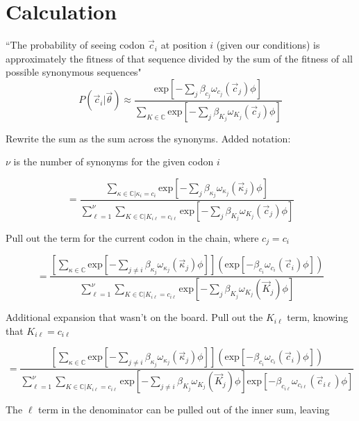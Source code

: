 \documentclass[11pt]{article} %
\begin{document}
\section{Calculation}

``The probability of seeing codon $\vec{c}_i$ at position $i$ (given our conditions) is approximately the fitness of that sequence divided by the sum of the fitness of all possible synonymous sequences"
\[
P(\vec{c}_i | \vec{\theta})
\approx
\frac{
\mbox{exp}\left[-\sum_{j} \beta_{c_j} \omega_{c_j} (\vec{c}_j) \phi \right]
}{
\sum _{K \in \mathbb{C}}
\mbox{exp}\left[-\sum_{j} \beta_{K_j} \omega_{K_j} (\vec{c}_j) \phi \right]
}
\]


Rewrite the sum as the sum across the synonyms.
Added notation: 

$\nu$ is the number of synonyms for the given codon $i$

\[
=
\frac{
\sum _{\kappa \in \mathbb{C} | \kappa_i = c_i}
\mbox{exp}\left[-\sum_{j} \beta_{\kappa_j} \omega_{\kappa_j} (\vec{\kappa}_j) \phi \right]
}{
\sum_{\ell=1}^\nu
\sum _{K \in \mathbb{C} | K_{i\ell} = c_{i\ell}}
\mbox{exp}\left[-\sum_{j} \beta_{K_j} \omega_{K_j} (\vec{c}_j) \phi \right]
}
\]

Pull out the term for the current codon in the chain, where $c_j=c_i$

\[
=
\frac{
\left[
\sum _{\kappa \in \mathbb{C}}
\mbox{exp}\left[-\sum_{j\neq i} \beta_{\kappa_j} \omega_{\kappa_j} (\vec{\kappa}_j) \phi \right]
\right]
\left(\mbox{exp}\left[-\beta_{c_i} \omega_{c_i} (\vec{c}_i) \phi \right]\right)
}{
\sum_{\ell=1}^\nu
\sum _{K \in \mathbb{C} | K_{i\ell} = c_{i\ell}}
\mbox{exp}\left[-\sum_{j} \beta_{K_j} \omega_{K_j} (\vec{K}_j) \phi \right]
}
\]


Additional expansion that wasn't on the board. Pull out the $K_{i\ell}$ term, knowing that $K_{i\ell}=c_{i\ell}$

\[
=
\frac{
\left[
\sum _{\kappa \in \mathbb{C}}
\mbox{exp}\left[-\sum_{j\neq i} \beta_{\kappa_j} \omega_{\kappa_j} (\vec{\kappa}_j) \phi \right]
\right]
\left(\mbox{exp}\left[-\beta_{c_i} \omega_{c_i} (\vec{c}_i) \phi \right]\right)
}{
\sum_{\ell=1}^\nu
\sum _{K \in \mathbb{C} | K_{i\ell} = c_{i\ell}}
\mbox{exp}\left[-\sum_{j\neq i} \beta_{K_j} \omega_{K_j} (\vec{K}_j) \phi \right]
\mbox{exp}\left[-\beta_{c_{i\ell}} \omega_{c_{i\ell}} (\vec{c}_{i\ell}) \phi \right]
}
\]

The $\ell$ term in the denominator can be pulled out of the inner sum, leaving
\end{document}
